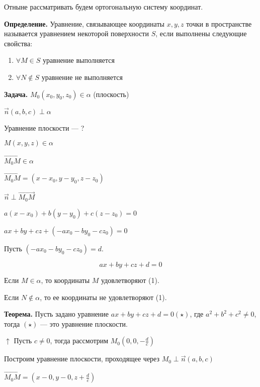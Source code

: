 \documentclass{article}
\begin{document}
    Отныне рассматривать будем ортогональную систему координат.

    \textbf{Определение.} Уравнение, связывающее координаты \(x, y, z\) точки в пространстве называется уравнением некоторой поверхности \(S\), если выполнены следующие свойства:
    
    \begin{enumerate}
        \item \(\forall M \in S\) уравнение выполняется
        \item \(\forall N \not \in S\) уравнение не выполняется
    \end{enumerate}

    \textbf{Задача.} \( M_0(x_0, y_0, z_0) \in \alpha \) (плоскость)

    \( \overrightarrow{n}(a, b, c) \perp \alpha \)

    Уравнение плоскости --- ?
    

    \( M(x, y, z) \in \alpha \)

    \( \overrightarrow{M_0M} \in \alpha \)

    \( \overrightarrow{M_0M} = (x-x_0, y-y_0, z-z_0) \)

    \( \overrightarrow{n} \perp \overrightarrow{M_0M} \)    

    \( a(x - x_0) + b(y - y_0) + c(z - z_0) = 0 \)

    \( ax + by + cz + (-ax_0 - by_0 - cz_0) = 0 \)

    Пусть \( (-ax_0 - by_0 - cz_0) = d \).

    \begin{equation}
        ax + by + cz + d = 0
    \end{equation}

    Если \(M \in \alpha\), то координаты \(M\) удовлетворяют (1).

    Если \( N \not\in \alpha \), то ее координаты не удовлетворяют (1).

    \textbf{Теорема.} Пусть задано уравнение \( ax + by + cz + d = 0 (\star) \), где \( a^2 + b^2 + c^2 \neq 0 \), тогда \((\star)\) --- это уравнение плоскости. 

    \( \uparrow \) Пусть \( c \neq 0 \), тогда рассмотрим \( M_0(0, 0, -\frac{d}{c}) \)

    Построим уравнение плоскости, проходящее через \( M_0 \perp \overrightarrow{n}(a, b, c) \)

    \( \overrightarrow{M_0M} = (x - 0, y - 0, z + \frac{d}{c}) \)
\end{document}
